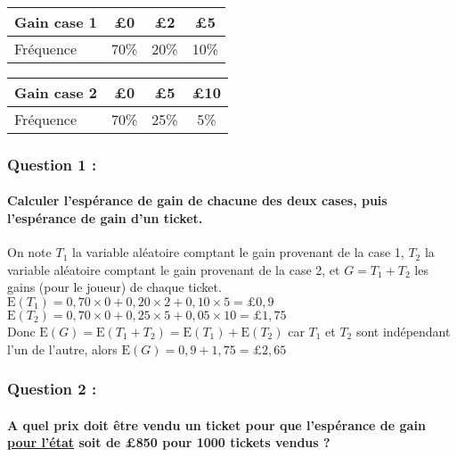 \documentclass[a4paper, 12pt]{article}
\begin{document}
\begin{center}
\begin{tabular}{ |l|c|c|c| }
    \hline
    Gain case 1 & £0 & £2 & £5 \\
    \hline
    Fréquence & 70\% & 20\% & 10\% \\
    \hline
\end{tabular}
\hspace{1cm}
\begin{tabular}{ |l|c|c|c| }
    \hline
    Gain case 2 & £0 & £5 & £10 \\
    \hline
    Fréquence & 70\% & 25\% & 5\% \\
    \hline
\end{tabular}
\end{center}

{}
\subsubsection*{Question 1 :}
\paragraph*{Calculer l'espérance de gain de chacune des deux cases, puis l'espérance de gain d'un ticket.\\[5mm]}

On note $T_1$ la variable aléatoire comptant le gain provenant de la case 1, $T_2$ la variable aléatoire comptant le gain provenant de la case 2, 
et $G = T_1 + T_2$ les gains (pour le joueur) de chaque ticket.
\\
$\text{E}(T_1) = 0,70 \times 0 + 0,20 \times 2 + 0,10 \times 5 = \pounds 0,9$ \\
$\text{E}(T_2) = 0,70 \times 0 + 0,25 \times 5 + 0,05 \times 10 = \pounds 1,75$ \\
Donc $\text{E}(G) = \text{E}(T_1 + T_2) = \text{E}(T_1) + \text{E}(T_2)$ car $T_1$ et $T_2$ sont indépendant l'un de l'autre, alors $\text{E}(G) = 0,9 + 1,75 = \pounds 2,65$

{}
\subsubsection*{Question 2 :}
\paragraph*{A quel prix doit être vendu un ticket pour que l'espérance de gain \underline{pour l'état} soit de £850 pour 1000 tickets vendus ?\\[5mm]}
\end{document}
